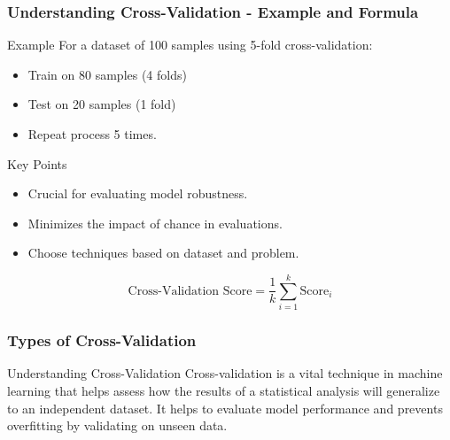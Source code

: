 \documentclass{beamer}
\begin{document}
\begin{frame}[fragile]
    \frametitle{Understanding Cross-Validation - Example and Formula}
    \begin{block}{Example}
        For a dataset of 100 samples using 5-fold cross-validation:
        \begin{itemize}
            \item Train on 80 samples (4 folds)
            \item Test on 20 samples (1 fold)
            \item Repeat process 5 times.
        \end{itemize}
    \end{block}
    
    \begin{block}{Key Points}
        \begin{itemize}
            \item Crucial for evaluating model robustness.
            \item Minimizes the impact of chance in evaluations.
            \item Choose techniques based on dataset and problem.
        \end{itemize}
    \end{block}

    \begin{equation}
    \text{Cross-Validation Score} = \frac{1}{k} \sum_{i=1}^{k} \text{Score}_{i}
    \end{equation}
\end{frame}

\begin{frame}[fragile]
    \frametitle{Types of Cross-Validation}
    \begin{block}{Understanding Cross-Validation}
        Cross-validation is a vital technique in machine learning that helps assess how the results of a statistical analysis will generalize to an independent dataset. It helps to evaluate model performance and prevents overfitting by validating on unseen data.
    \end{block}
\end{frame}
\end{document}
